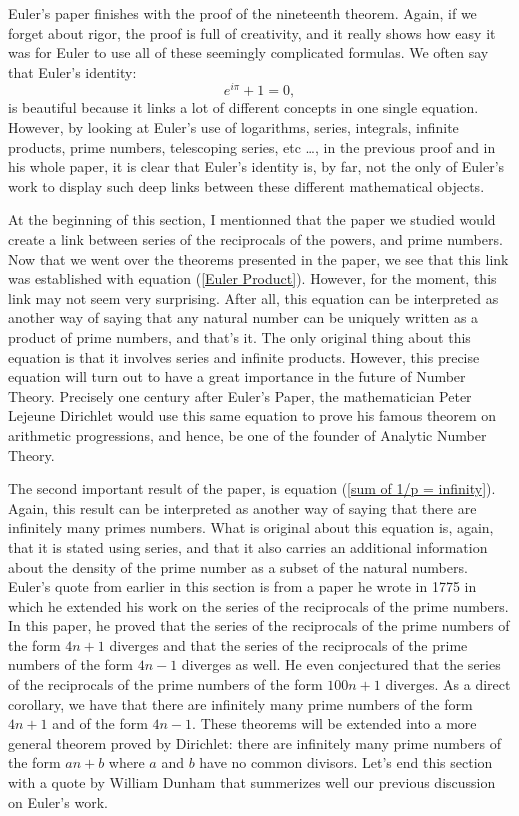 Euler's paper finishes with the proof of the nineteenth theorem. Again, if we forget about rigor, the proof is full of creativity, and it really shows how easy it was for Euler to use all of these seemingly complicated formulas. We often say that Euler's identity:
$$e^{i\pi} + 1 = 0,$$
is beautiful because it links a lot of different concepts in one single equation. However, by looking at Euler's use of logarithms, series, integrals, infinite products, prime numbers, telescoping series, etc \dots, in the previous proof and in his whole paper, it is clear that Euler's identity is, by far, not the only of Euler's work to display such deep links between these different mathematical objects.

At the beginning of this section, I mentionned that the paper we studied would create a link between series of the reciprocals of the powers, and prime numbers. Now that we went over the theorems presented in the paper, we see that this link was established with equation (\ref{Euler Product}). However, for the moment, this link may not seem very surprising. After all, this equation can be interpreted as another way of saying that any natural number can be uniquely written as a product of prime numbers, and that's it. The only original thing about this equation is that it involves series and infinite products. However, this precise equation will turn out to have a great importance in the future of Number Theory. Precisely one century after Euler's Paper, the mathematician Peter Lejeune Dirichlet would use this same equation to prove his famous theorem on arithmetic progressions, and hence, be one of the founder of Analytic Number Theory. 

The second important result of the paper, is equation (\ref{sum of 1/p = infinity}). Again, this result can be interpreted as another way of saying that there are infinitely many primes numbers. What is original about this equation is, again, that it is stated using series, and that it also carries an additional information about the density of the prime number as a subset of the natural numbers. Euler's quote from earlier in this section is from a paper he wrote in 1775 in which he extended his work on the series of the reciprocals of the prime numbers. In this paper, he proved that the series of the reciprocals of the prime numbers of the form $4n+1$ diverges and that the series of the reciprocals of the prime numbers of the form $4n-1$ diverges as well. He even conjectured that the series of the reciprocals of the prime numbers of the form $100n + 1$ diverges. As a direct corollary, we have that there are infinitely many prime numbers of the form $4n+1$ and of the form $4n-1$. These theorems will be extended into a more general theorem proved by Dirichlet: there are infinitely many prime numbers of the form $an + b$ where $a$ and $b$ have no common divisors. Let's end this section with a quote by William Dunham that summerizes well our previous discussion on Euler's work.

